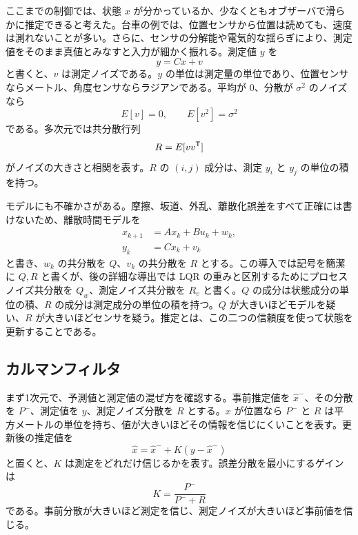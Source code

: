 ここまでの制御では、状態 $x$ が分かっているか、少なくともオブザーバで滑らかに推定できると考えた。台車の例では、位置センサから位置は読めても、速度は測れないことが多い。さらに、センサの分解能や電気的な揺らぎにより、測定値をそのまま真値とみなすと入力が細かく振れる。測定値 $y$ を
\begin{equation}
  y=Cx+v
\end{equation}
と書くと、$v$ は測定ノイズである。$y$ の単位は測定量の単位であり、位置センサならメートル、角度センサならラジアンである。平均が 0、分散が $\sigma^2$ のノイズなら
\begin{equation}
  E[v]=0,
  \qquad
  E[v^2]=\sigma^2
\end{equation}
である。多次元では共分散行列
\begin{equation}
  R=E[vv^{\mathsf{T}}]
\end{equation}
がノイズの大きさと相関を表す。$R$ の $(i,j)$ 成分は、測定 $y_i$ と $y_j$ の単位の積を持つ。

モデルにも不確かさがある。摩擦、坂道、外乱、離散化誤差をすべて正確には書けないため、離散時間モデルを
\begin{align}
  x_{k+1}&=A x_k+B u_k+w_k,\\
  y_k&=C x_k+v_k
\end{align}
と書き、$w_k$ の共分散を $Q$、$v_k$ の共分散を $R$ とする。この導入では記号を簡潔に $Q,R$ と書くが、後の詳細な導出では LQR の重みと区別するためにプロセスノイズ共分散を $Q_w$、測定ノイズ共分散を $R_v$ と書く。$Q$ の成分は状態成分の単位の積、$R$ の成分は測定成分の単位の積を持つ。$Q$ が大きいほどモデルを疑い、$R$ が大きいほどセンサを疑う。推定とは、この二つの信頼度を使って状態を更新することである。

\subsection{カルマンフィルタ}

まず1次元で、予測値と測定値の混ぜ方を確認する。事前推定値を $\hat{x}^-$、その分散を $P^-$、測定値を $y$、測定ノイズ分散を $R$ とする。$x$ が位置なら $P^-$ と $R$ は平方メートルの単位を持ち、値が大きいほどその情報を信じにくいことを表す。更新後の推定値を
\begin{equation}
  \hat{x}=\hat{x}^-+K(y-\hat{x}^-)
\end{equation}
と置くと、$K$ は測定をどれだけ信じるかを表す。誤差分散を最小にするゲインは
\begin{equation}
  K=\frac{P^-}{P^-+R}
\end{equation}
である。事前分散が大きいほど測定を信じ、測定ノイズが大きいほど事前値を信じる。

